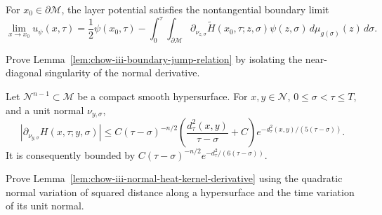 \begin{lemma}
\label{lem:chow-iii-boundary-jump-relation}
For \(x_0\in\partial\mathcal M\), the layer potential satisfies the
nontangential boundary limit
\[
 \lim_{x\to x_0}u_\psi(x,\tau)
 =\frac12\psi(x_0,\tau)-\int_0^\tau\!\int_{\partial\mathcal M}
 \partial_{\nu_{z,\sigma}}\widetilde H(x_0,\tau;z,\sigma)
 \psi(z,\sigma)\,d\mu_{g(\sigma)}(z)\,d\sigma.
\]
\end{lemma}

\begin{claim}
\label{clm:chow-iii-boundary-jump-exercise}
Prove Lemma~\ref{lem:chow-iii-boundary-jump-relation} by isolating the
near-diagonal singularity of the normal derivative.
\end{claim}

\begin{lemma}
\label{lem:chow-iii-normal-heat-kernel-derivative}
Let \(\mathcal N^{n-1}\subset\mathcal M\) be a compact smooth hypersurface.
For \(x,y\in\mathcal N\), \(0\le\sigma<\tau\le T\), and a unit normal
\(\nu_{y,\sigma}\),
\[
 \left|\partial_{\nu_{y,\sigma}}H(x,\tau;y,\sigma)\right|
 \le C(\tau-\sigma)^{-n/2}
 \left(\frac{d_\tau^2(x,y)}{\tau-\sigma}+C\right)
 e^{-d_\tau^2(x,y)/(5(\tau-\sigma))}.
\]
It is consequently bounded by
\(C(\tau-\sigma)^{-n/2}e^{-d_\tau^2/(6(\tau-\sigma))}\).
\end{lemma}

\begin{claim}
\label{clm:chow-iii-normal-derivative-exercise}
Prove Lemma~\ref{lem:chow-iii-normal-heat-kernel-derivative} using the
quadratic normal variation of squared distance along a hypersurface and the
time variation of its unit normal.
\end{claim}


